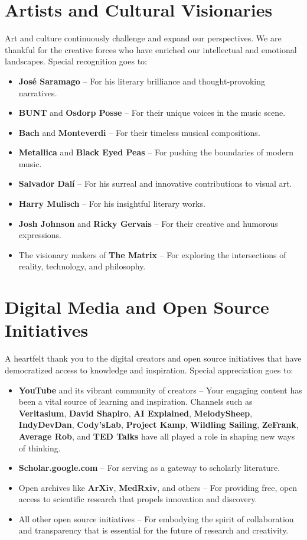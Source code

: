 \documentclass[12pt,openany]{book}
\begin{document}
\section*{Artists and Cultural Visionaries}
Art and culture continuously challenge and expand our perspectives. We are thankful for the creative forces who have enriched our intellectual and emotional landscapes. Special recognition goes to:
\begin{itemize}
    \item \textbf{José Saramago} – For his literary brilliance and thought-provoking narratives.
    \item \textbf{BUNT} and \textbf{Osdorp Posse} – For their unique voices in the music scene.
    \item \textbf{Bach} and \textbf{Monteverdi} – For their timeless musical compositions.
    \item \textbf{Metallica} and \textbf{Black Eyed Peas} – For pushing the boundaries of modern music.
    \item \textbf{Salvador Dalí} – For his surreal and innovative contributions to visual art.
    \item \textbf{Harry Mulisch} – For his insightful literary works.
    \item \textbf{Josh Johnson} and \textbf{Ricky Gervais} – For their creative and humorous expressions.
    \item The visionary makers of \textbf{The Matrix} – For exploring the intersections of reality, technology, and philosophy.
\end{itemize}

\section*{Digital Media and Open Source Initiatives}
A heartfelt thank you to the digital creators and open source initiatives that have democratized access to knowledge and inspiration. Special appreciation goes to:
\begin{itemize}
    \item \textbf{YouTube} and its vibrant community of creators – Your engaging content has been a vital source of learning and inspiration. Channels such as \textbf{Veritasium}, \textbf{David Shapiro}, \textbf{AI Explained}, \textbf{MelodySheep}, \textbf{IndyDevDan}, \textbf{Cody’sLab}, \textbf{Project Kamp}, \textbf{Wildling Sailing}, \textbf{ZeFrank}, \textbf{Average Rob}, and \textbf{TED Talks} have all played a role in shaping new ways of thinking.
    \item \textbf{Scholar.google.com} – For serving as a gateway to scholarly literature.
    \item Open archives like \textbf{ArXiv}, \textbf{MedRxiv}, and others – For providing free, open access to scientific research that propels innovation and discovery.
    \item All other open source initiatives – For embodying the spirit of collaboration and transparency that is essential for the future of research and creativity.
\end{itemize}
\end{document}
